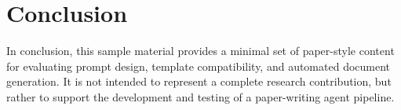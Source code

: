 \section{Conclusion}

In conclusion, this sample material provides a minimal set of paper-style content for evaluating prompt design, template compatibility, and automated document generation. It is not intended to represent a complete research contribution, but rather to support the development and testing of a paper-writing agent pipeline.
